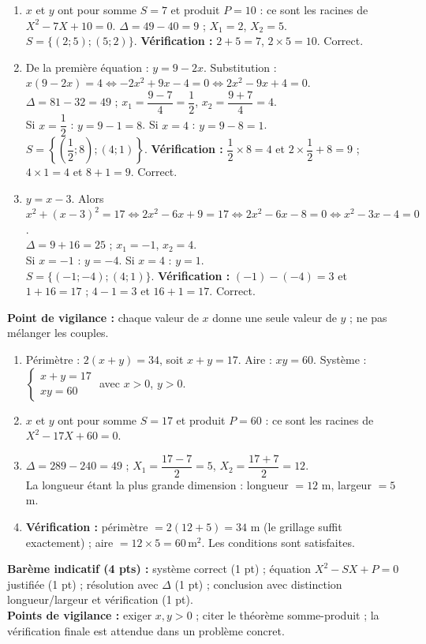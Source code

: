\documentclass[11pt]{article}
\begin{document}
\begin{corrige}
\begin{enumerate}
    \item $x$ et $y$ ont pour somme $S=7$ et produit $P=10$ : ce sont les racines de $X^2-7X+10=0$. $\Delta=49-40=9$ ; $X_1=2$, $X_2=5$.\\
    $S=\{(2;5);(5;2)\}$. \textbf{Vérification :} $2+5=7$, $2\times 5=10$. Correct.
    \item De la première équation : $y=9-2x$. Substitution : $x(9-2x)=4 \iff -2x^2+9x-4=0 \iff 2x^2-9x+4=0$.\\
    $\Delta=81-32=49$ ; $x_1=\dfrac{9-7}{4}=\dfrac{1}{2}$, $x_2=\dfrac{9+7}{4}=4$.\\
    Si $x=\dfrac{1}{2}$ : $y=9-1=8$. Si $x=4$ : $y=9-8=1$.\\
    $S=\left\{\left(\dfrac{1}{2};8\right);(4;1)\right\}$. \textbf{Vérification :} $\dfrac{1}{2}\times 8=4$ et $2\times\dfrac{1}{2}+8=9$ ; $4\times 1=4$ et $8+1=9$. Correct.
    \item $y=x-3$. Alors $x^2+(x-3)^2=17 \iff 2x^2-6x+9=17 \iff 2x^2-6x-8=0 \iff x^2-3x-4=0$.\\
    $\Delta=9+16=25$ ; $x_1=-1$, $x_2=4$.\\
    Si $x=-1$ : $y=-4$. Si $x=4$ : $y=1$.\\
    $S=\{(-1;-4);(4;1)\}$. \textbf{Vérification :} $(-1)-(-4)=3$ et $1+16=17$ ; $4-1=3$ et $16+1=17$. Correct.
\end{enumerate}
\textbf{Point de vigilance :} chaque valeur de $x$ donne une seule valeur de $y$ ; ne pas mélanger les couples.
\end{corrige}

\begin{corrige}
\begin{enumerate}
    \item Périmètre : $2(x+y)=34$, soit $x+y=17$. Aire : $xy=60$. Système : $\begin{cases} x+y=17 \\ xy=60 \end{cases}$ avec $x>0$, $y>0$.
    \item $x$ et $y$ ont pour somme $S=17$ et produit $P=60$ : ce sont les racines de $X^2-17X+60=0$.
    \item $\Delta=289-240=49$ ; $X_1=\dfrac{17-7}{2}=5$, $X_2=\dfrac{17+7}{2}=12$.\\
    La longueur étant la plus grande dimension : longueur $=12$ m, largeur $=5$ m.
    \item \textbf{Vérification :} périmètre $=2(12+5)=34$ m (le grillage suffit exactement) ; aire $=12\times 5=60\,\text{m}^2$. Les conditions sont satisfaites.
\end{enumerate}
\textbf{Barème indicatif (4 pts) :} système correct (1 pt) ; équation $X^2-SX+P=0$ justifiée (1 pt) ; résolution avec $\Delta$ (1 pt) ; conclusion avec distinction longueur/largeur et vérification (1 pt).\\
\textbf{Points de vigilance :} exiger $x,y>0$ ; citer le théorème somme-produit ; la vérification finale est attendue dans un problème concret.
\end{corrige}
\end{document}
